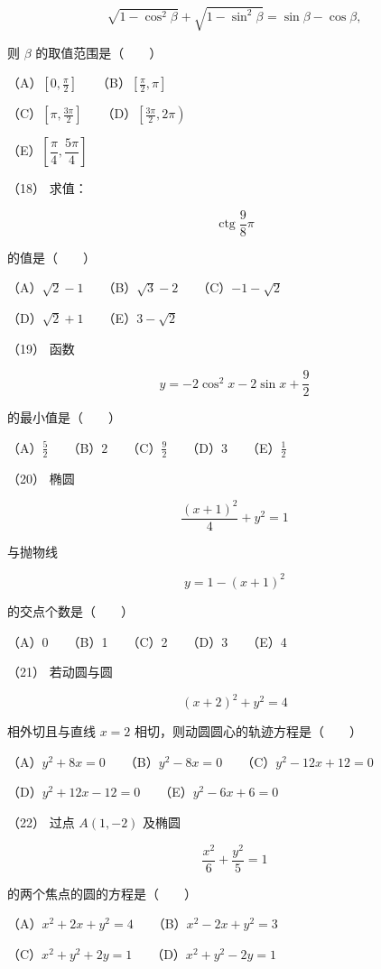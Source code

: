 \begin{answer}
\nopagebreak[4]
\[
\sqrt{1-\cos^2\beta}+\sqrt{1-\sin^2\beta}
=\sin\beta-\cos\beta,
\]

则 $\beta$ 的取值范围是\mbox{（　　）}

（A）$\left[0,\frac\pi2\right]$　　（B）$\left[\frac\pi2,\pi\right]$

（C）$\left[\pi,\frac{3\pi}2\right]$　　（D）$\left[\frac{3\pi}2,2\pi\right)$

（E）$\left[\dfrac\pi4,\dfrac{5\pi}4\right]$

（18） 求值：

\nopagebreak[4]
\[
\operatorname{ctg}\frac98\pi
\]

的值是\mbox{（　　）}

（A）$\sqrt2-1$　　（B）$\sqrt3-2$　　（C）$-1-\sqrt2$

（D）$\sqrt2+1$　　（E）$3-\sqrt2$

（19） 函数

\nopagebreak[4]
\[
y=-2\cos^2x-2\sin x+\frac92
\]

的最小值是\mbox{（　　）}

（A）$\frac52$　　（B）$2$　　（C）$\frac92$　　（D）$3$　　（E）$\frac12$

（20） 椭圆

\nopagebreak[4]
\[
\frac{(x+1)^2}{4}+y^2=1
\]

与抛物线

\nopagebreak[4]
\[
y=1-(x+1)^2
\]

的交点个数是\mbox{（　　）}

（A）0　　（B）1　　（C）2　　（D）3　　（E）4

（21） 若动圆与圆

\nopagebreak[4]
\[
(x+2)^2+y^2=4
\]

相外切且与直线 $x=2$ 相切，则动圆圆心的轨迹方程是\mbox{（　　）}

（A）$y^2+8x=0$　　（B）$y^2-8x=0$　　（C）$y^2-12x+12=0$

（D）$y^2+12x-12=0$　　（E）$y^2-6x+6=0$

（22） 过点 $A(1,-2)$ 及椭圆

\nopagebreak[4]
\[
\frac{x^2}{6}+\frac{y^2}{5}=1
\]

的两个焦点的圆的方程是\mbox{（　　）}

（A）$x^2+2x+y^2=4$　　（B）$x^2-2x+y^2=3$

（C）$x^2+y^2+2y=1$　　（D）$x^2+y^2-2y=1$


\end{answer}
